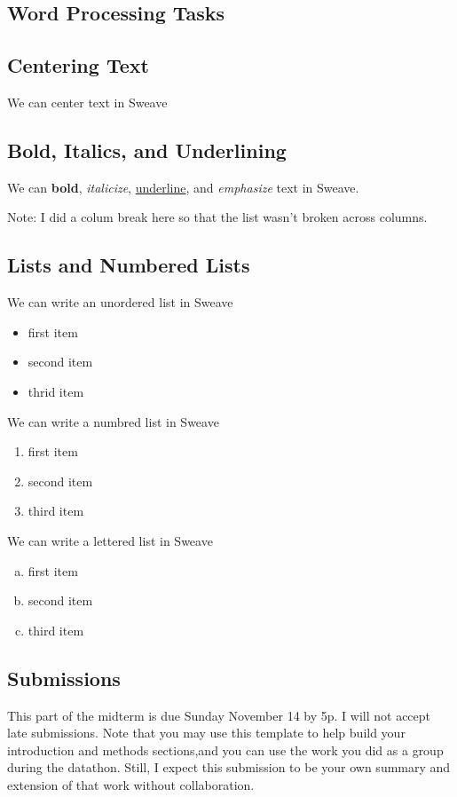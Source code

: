 \documentclass{article}\usepackage[]{graphicx}\usepackage[]{xcolor}
\begin{document}
\begin{multicols}{2}
\section{Word Processing Tasks}

\subsection{Centering Text}
\begin{center}
We can center text in Sweave
\end{center}


\subsection{Bold, Italics, and Underlining}
We can \textbf{bold}, \emph{italicize}, \underline{underline}, and \emph{emphasize} text
in Sweave.

Note: I did a colum break here so that the list wasn't 
broken across columns.

\columnbreak

\subsection{Lists and Numbered Lists}
We can write an unordered list in Sweave
\begin{itemize}
  \item first item
  \item second item
  \item thrid item
\end{itemize}
We can write a numbred list in Sweave
\begin{enumerate}
  \item first item
  \item second item
  \item third item
\end{enumerate}
We can write a lettered list in Sweave
\begin{enumerate}[a.]\itemsep0em
  \item first item
  \item second item
  \item third item
\end{enumerate}




\subsection{Submissions}
 This part of the midterm is due Sunday November 14 by 5p.
 I will not accept late submissions. Note that you may use
 this template to help build your introduction and methods
 sections,and you can use the work you did as a group during
 the datathon. Still, I expect this submission to be your own
 summary and extension of that work without collaboration.



\end{multicols}
\end{document}
